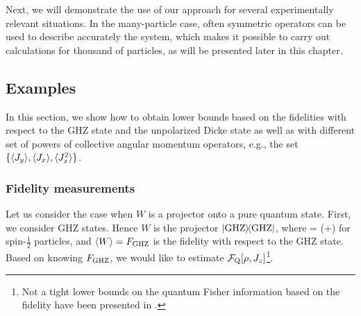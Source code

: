 Next, we will demonstrate the use of our approach for several experimentally relevant situations.
In the many-particle case, often symmetric operators can be used to describe accurately the system, which makes it possible to carry out calculations for thousand of particles, as will be presented later in this chapter.

\subsection{Examples}
\label{sec:lt-examples}

In this section, we show how to obtain lower bounds based on the fidelities with respect to the GHZ state and the unpolarized Dicke state as well as with different set of powers of collective angular momentum operators, e.g., the set $\{\langle{J_y}\rangle, \langle{J_x}\rangle, \langle{J_x^2}\rangle\}$.

\subsubsection{Fidelity measurements}
\label{sec:lt-bounds-fidelity}

Let us consider the case when $W$ is a projector onto a pure quantum state.
First, we consider GHZ states.
Hence $W$ is the projector $\vert{\textnormal{GHZ}}\rangle{\!}\langle{\textnormal{GHZ}}\vert$, where
\be
  \ket{\ghz} = (+)
  \label{eq:lt-ghz-state}
\ee
for spin-$\frac{1}{2}$ particles, and $\langle{W}\rangle=F_{\textnormal{GHZ}}$ is the fidelity with respect to the GHZ state.
Based on knowing $F_{\textnormal{GHZ}}$, we would like to estimate $\mathcal{F}_{\textnormal{Q}}[{\textstyle \rho,J_z}]$\footnote{
Not a tight lower bounds on the quantum Fisher information based on the fidelity have been presented in \cite{Augusiak2016}.}.

